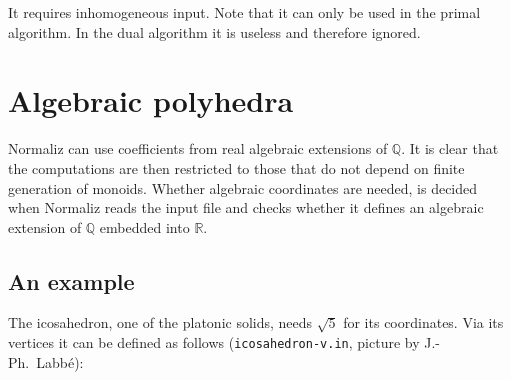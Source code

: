 \documentclass[12pt,a4paper]{scrartcl}
\theoremstyle{definition}
\def\QQ{{\mathbb Q}}
\def\RR{{\mathbb R}}
\begin{document}
It requires inhomogeneous input. Note that it can only be used in the primal algorithm. In the dual algorithm it is useless and therefore ignored.


\section{Algebraic polyhedra}\label{Algebraic}

Normaliz can use coefficients from real algebraic extensions of $\QQ$. It is clear that the computations are then restricted to those that do not depend on finite generation of monoids. Whether algebraic coordinates are needed, is decided when Normaliz reads the input file and checks whether it defines an algebraic extension of $\QQ$ embedded into $\RR$.

\subsection{An example}\label{alg_ex}

The icosahedron, one of the platonic solids, needs $\sqrt 5$ for its coordinates. Via its vertices it can be defined as follows (\verb|icosahedron-v.in|, picture by J.-Ph.~Labbé):
\end{document}
